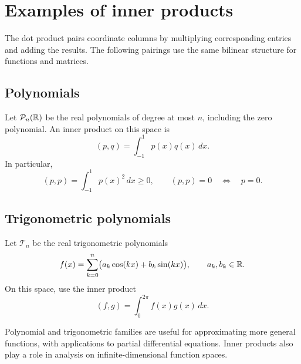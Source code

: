 \section{Examples of inner products}
\label{sec:linear-algebra-i:examples-of-inner-products}

The dot product pairs coordinate columns by multiplying corresponding
entries and adding the results. The following pairings use the same
bilinear structure for functions and matrices.

\subsection{Polynomials}

\begin{example}
  Let \(\mathcal P_n(\mathbb{R})\) be the real polynomials of degree at most
  \(n\), including the zero polynomial. An inner product on this space is
  \[
    (p,q)=\int_{-1}^1 p(x)q(x)\,dx.
  \]
  In particular,
  \[
    (p,p)=\int_{-1}^1 p(x)^2\,dx\ge0,
    \qquad (p,p)=0\quad\Longleftrightarrow\quad p=0.
  \]
\end{example}

\subsection{Trigonometric polynomials}

\begin{example}
  Let \(\mathcal T_n\) be the real trigonometric polynomials
  \[
    f(x)=\sum_{k=0}^n\bigl(a_k\cos(kx)+b_k\sin(kx)\bigr),
    \qquad a_k,b_k\in\mathbb{R}.
  \]
  On this space, use the inner product
  \[
    (f,g)=\int_0^{2\pi}f(x)g(x)\,dx.
  \]
\end{example}

Polynomial and trigonometric families are useful for approximating more
general functions, with applications to partial differential equations.
Inner products also play a role in analysis on infinite-dimensional
function spaces.

